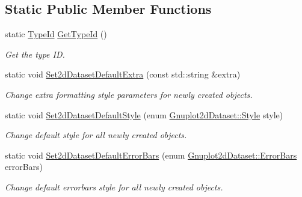 \subsection*{Static Public Member Functions}
\begin{DoxyCompactItemize}
\item 
static \hyperlink{classns3_1_1TypeId}{Type\+Id} \hyperlink{classns3_1_1GnuplotAggregator_a3ea59626cd751e61a11f4ec5ef85e5a4}{Get\+Type\+Id} ()
\begin{DoxyCompactList}\small\item\em Get the type ID. \end{DoxyCompactList}\item 
static void \hyperlink{classns3_1_1GnuplotAggregator_a11fa5523026e2188bbf1b2b55adb1b35}{Set2d\+Dataset\+Default\+Extra} (const std\+::string \&extra)
\begin{DoxyCompactList}\small\item\em Change extra formatting style parameters for newly created objects. \end{DoxyCompactList}\item 
static void \hyperlink{classns3_1_1GnuplotAggregator_af284318b5c189d71070b88ddfd57f7a1}{Set2d\+Dataset\+Default\+Style} (enum \hyperlink{classns3_1_1Gnuplot2dDataset_abdad90b4b2abed9a198e4b19470de882}{Gnuplot2d\+Dataset\+::\+Style} style)
\begin{DoxyCompactList}\small\item\em Change default style for all newly created objects. \end{DoxyCompactList}\item 
static void \hyperlink{classns3_1_1GnuplotAggregator_a9f3be1ab95ecaa41eb9552c6312e9a2b}{Set2d\+Dataset\+Default\+Error\+Bars} (enum \hyperlink{classns3_1_1Gnuplot2dDataset_a5984738d258811bed5eff163d4e3d648}{Gnuplot2d\+Dataset\+::\+Error\+Bars} error\+Bars)
\begin{DoxyCompactList}\small\item\em Change default errorbars style for all newly created objects. \end{DoxyCompactList}\end{DoxyCompactItemize}
